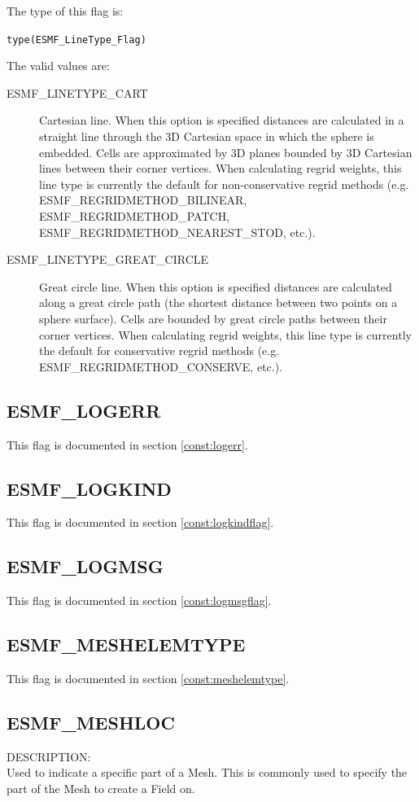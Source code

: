 The type of this flag is:

{\tt type(ESMF\_LineType\_Flag)}

The valid values are:
 \begin{description}
\item [ESMF\_LINETYPE\_CART]
   Cartesian line. When this option is specified distances are calculated in a straight line through the 3D Cartesian space
   in which the sphere is embedded. Cells are approximated by 3D planes bounded by 3D Cartesian lines between their corner vertices. 
   When calculating regrid weights, this line type is currently the default for non-conservative regrid methods (e.g. ESMF\_REGRIDMETHOD\_BILINEAR, 
   ESMF\_REGRIDMETHOD\_PATCH, ESMF\_REGRIDMETHOD\_NEAREST\_STOD, etc.).
\item [ESMF\_LINETYPE\_GREAT\_CIRCLE]
   Great circle line. When this option is specified distances are calculated along a great circle path (the shortest distance
   between two points on a sphere surface). Cells are bounded by great circle paths between their corner vertices. When calculating regrid 
   weights, this line type is currently the default for conservative regrid methods (e.g. ESMF\_REGRIDMETHOD\_CONSERVE, etc.).
\end{description}


\subsection{ESMF\_LOGERR}
This flag is documented in section \ref{const:logerr}.

\subsection{ESMF\_LOGKIND}
This flag is documented in section \ref{const:logkindflag}.

\subsection{ESMF\_LOGMSG}
This flag is documented in section \ref{const:logmsgflag}.

\subsection{ESMF\_MESHELEMTYPE}
This flag is documented in section \ref{const:meshelemtype}.

\subsection{ESMF\_MESHLOC}
\label{const:meshloc}
{\sf DESCRIPTION:\\}  
Used to indicate a specific part of a Mesh. This is commonly used to specify the part of the Mesh to
create a Field on. 

